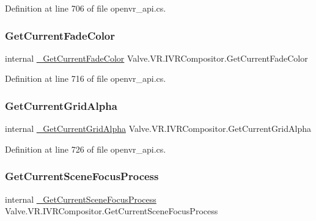 Definition at line 706 of file openvr\+\_\+api.\+cs.

\mbox{\label{struct_valve_1_1_v_r_1_1_i_v_r_compositor_a628fbabf5a244406d5112eced13c63dc}} 
\subsubsection{\texorpdfstring{GetCurrentFadeColor}{GetCurrentFadeColor}}
{\footnotesize\ttfamily internal \mbox{\hyperlink{struct_valve_1_1_v_r_1_1_i_v_r_compositor_ae7afb03647118e23520b2b59de4c5ec4}{\+\_\+\+Get\+Current\+Fade\+Color}} Valve.\+V\+R.\+I\+V\+R\+Compositor.\+Get\+Current\+Fade\+Color}



Definition at line 716 of file openvr\+\_\+api.\+cs.

\mbox{\label{struct_valve_1_1_v_r_1_1_i_v_r_compositor_a391e74f059c4716270e2e8d168662850}} 
\subsubsection{\texorpdfstring{GetCurrentGridAlpha}{GetCurrentGridAlpha}}
{\footnotesize\ttfamily internal \mbox{\hyperlink{struct_valve_1_1_v_r_1_1_i_v_r_compositor_af32ee4004d4955894735f00e6d4dfbe3}{\+\_\+\+Get\+Current\+Grid\+Alpha}} Valve.\+V\+R.\+I\+V\+R\+Compositor.\+Get\+Current\+Grid\+Alpha}



Definition at line 726 of file openvr\+\_\+api.\+cs.

\mbox{\label{struct_valve_1_1_v_r_1_1_i_v_r_compositor_a7e7b837ace250e8312b5fe1d3353f964}} 
\subsubsection{\texorpdfstring{GetCurrentSceneFocusProcess}{GetCurrentSceneFocusProcess}}
{\footnotesize\ttfamily internal \mbox{\hyperlink{struct_valve_1_1_v_r_1_1_i_v_r_compositor_a5ae9bface8b9a771d2d7240a2b425a7e}{\+\_\+\+Get\+Current\+Scene\+Focus\+Process}} Valve.\+V\+R.\+I\+V\+R\+Compositor.\+Get\+Current\+Scene\+Focus\+Process}



